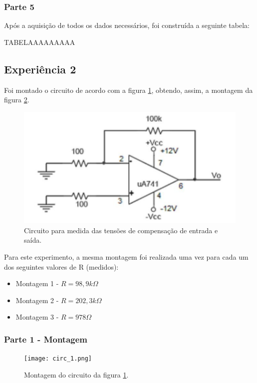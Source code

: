 \documentclass{abntex2}
\begin{document}
\subsubsection{Parte 5}

Após a aquisição de todos os dados necessários, foi construída a seguinte tabela:

TABELAAAAAAAAA
\subsection{Experiência 2}

Foi montado o circuito de acordo com a figura \ref{fig:circuito2}, obtendo, assim, a montagem da figura \ref{fig:montagem2}.

\begin{figure}[h]
  \centering
  \includegraphics[scale = 0.5]{exp2.png}
  \caption{Circuito para medida das tensões de compensação de entrada e saída.}
  \label{fig:circuito2}
\end{figure}

Para este experimento, a mesma montagem foi realizada uma vez para cada um dos seguintes valores de R (medidos):
\begin{itemize}
  \item Montagem 1 - $R = 98,9k\Omega$
  \item Montagem 2 - $R = 202,3k\Omega$
  \item Montagem 3 - $R = 978\Omega$
\end{itemize}

\subsubsection{Parte 1 - Montagem}

\begin{figure}[h]
  \centering
  \texttt{[image: circ\_1.png]}
  \caption{Montagem do circuito da figura \ref{fig:circuito2}.}
  \label{fig:montagem2}
\end{figure}
\end{document}
